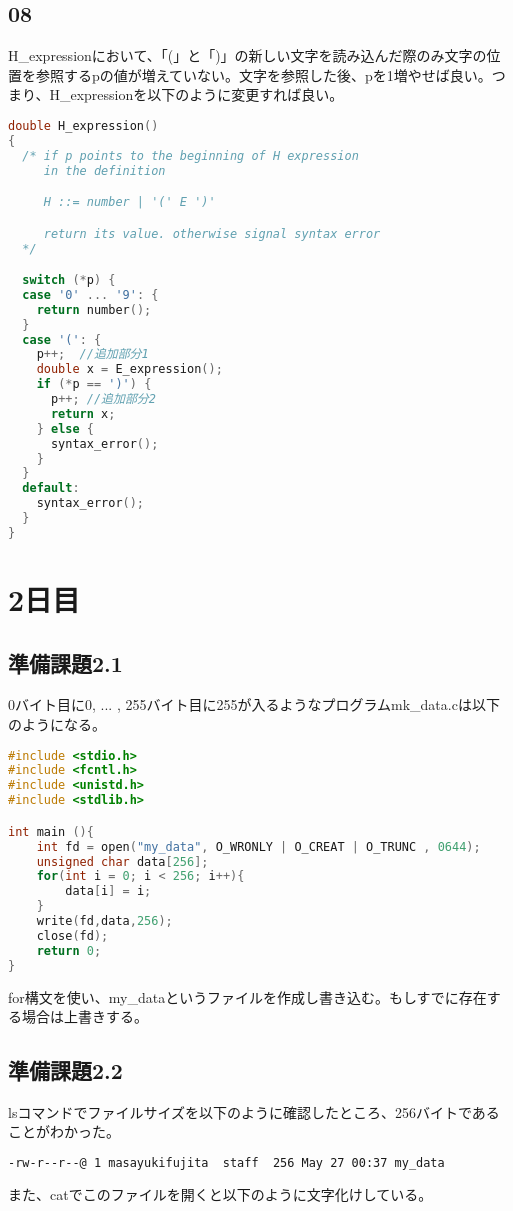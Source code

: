 \documentclass{ltjsarticle}
\begin{document}
\subsection{08}
H\_expressionにおいて、「(」と「)」の新しい文字を読み込んだ際のみ文字の位置を参照するpの値が増えていない。文字を参照した後、pを1増やせば良い。つまり、H\_expressionを以下のように変更すれば良い。
\begin{lstlisting}[caption=p08.c 変更部分, language=C]
double H_expression() 
{
  /* if p points to the beginning of H expression
     in the definition 

     H ::= number | '(' E ')'

     return its value. otherwise signal syntax error
  */

  switch (*p) {
  case '0' ... '9': {
    return number();
  }
  case '(': {
    p++;  //追加部分1
    double x = E_expression();
    if (*p == ')') {
      p++; //追加部分2
      return x;
    } else {
      syntax_error();
    }
  }
  default:
    syntax_error();
  }
}
\end{lstlisting}

\section{2日目}
\subsection{準備課題2.1}
0バイト目に0, ... , 255バイト目に255が入るようなプログラムmk\_data.cは以下のようになる。
\begin{lstlisting}[caption=mk\_data.c,language=C]
#include <stdio.h>
#include <fcntl.h>
#include <unistd.h>
#include <stdlib.h>

int main (){
    int fd = open("my_data", O_WRONLY | O_CREAT | O_TRUNC , 0644);
    unsigned char data[256];
    for(int i = 0; i < 256; i++){
        data[i] = i;
    }
    write(fd,data,256);
    close(fd);
    return 0;
}
\end{lstlisting}
for構文を使い、my\_dataというファイルを作成し書き込む。もしすでに存在する場合は上書きする。
\subsection{準備課題2.2}
lsコマンドでファイルサイズを以下のように確認したところ、256バイトであることがわかった。
\begin{lstlisting}[caption=ファイルサイズの確認,language=bash]
% ls -l my_data
-rw-r--r--@ 1 masayukifujita  staff  256 May 27 00:37 my_data
\end{lstlisting}
また、catでこのファイルを開くと以下のように文字化けしている。
\end{document}
